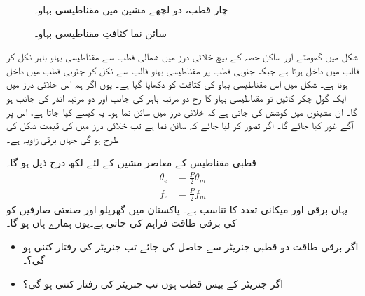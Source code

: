 \begin{figure}
\begin{minipage}{0.45\textwidth}
\caption{چار قطب، دو لچھے مشین میں مقناطیسی بہاو۔}
\label{شکل_گھومتے_مشین_چار_قطب_کا_بہاو}
\end{minipage}%
\begin{minipage}{0.45\textwidth}
\centering
\caption{سائن نما کثافتِ مقناطیسی بہاو۔}
\label{شکل_گھومتے_مشین_سائن_نما_بہاو}
\end{minipage}%
\end{figure}



شکل  میں گھومتے اور ساکن حصہ کے بیچ خلائی درز میں  شمالی قطب سے مقناطیسی بہاو باہر نکل کر  قالب میں داخل ہوتا ہے جبکہ جنوبی قطب پر مقناطیسی بہاو قالب سے نکل کر جنوبی قطب میں  داخل ہوتا ہے۔ شکل   میں اس مقناطیسی بہاو کی کثافت کو دکھایا گیا ہے۔ یوں اگر ہم اس خلائی درز میں ایک گول چکر کاٹیں تو مقناطیسی بہاو کا رخ  دو مرتبہ باہر کی جانب اور دو مرتبہ اندر کی جانب ہو گا۔ ان مشینوں  میں کوشش کی جاتی ہے کہ خلائی درز میں  سائن نما ہو۔ یہ کیسے کیا جاتا ہے، اس پر آگے غور کیا جائے گا۔ اگر تصور کر لیا جائے کہ  سائن نما ہے تب  خلائی درز میں  کی   قیمت شکل   کی طرح ہو گی جہاں  برقی زاویہ ہے۔ 

 قطبی مقناطیس کے معاصر مشین  کے لئے لکھ درج ذیل ہو گا۔
\begin{align}
\theta_e&=\frac{P}{2} \theta_m\label{مساوات_گھومتے_مشین_برقی_میکانی_زاویہ_تعلق}\\
f_e&=\frac{P}{2} f_m  \label{مساوات_گھومتے_مشین_برقی_میکانی_تعدد_تعلق}
\end{align}
یہاں برقی اور میکانی  تعدد کا تناسب  ہے۔ 
%
پاکستان میں گھریلو اور صنعتی صارفین کو  کی برقی طاقت فراہم کی جاتی ہے۔یوں ہمارے ہاں  ہو گا۔
\begin{itemize}
\item
اگر برقی طاقت دو قطبی جنریٹر سے حاصل کی جائے تب جنریٹر  کی رفتار کتنی ہو گی؟۔
\item
اگر جنریٹر کے بیس قطب ہوں تب  جنریٹر کی رفتار کتنی ہو گی؟
\end{itemize}

